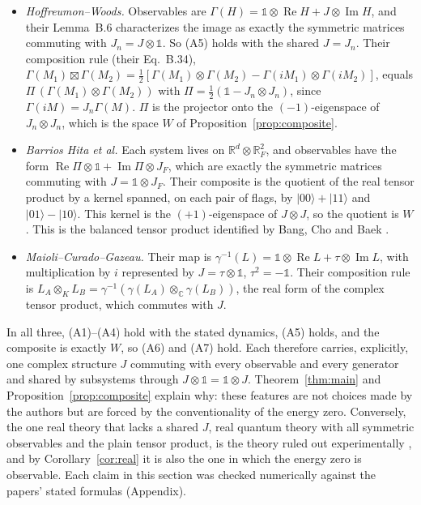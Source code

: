 \documentclass[11pt]{article}
\theoremstyle{remark}
\newcommand{\R}{\mathbb{R}}
\newcommand{\C}{\mathbb{C}}
\newcommand{\one}{\mathbb{1}}
\begin{document}
\begin{itemize}
\item \emph{Hoffreumon--Woods.} Observables are $\Gamma(H)=\one\otimes\operatorname{Re}H+J\otimes\operatorname{Im}H$, and their Lemma~B.6 characterizes the image as exactly the symmetric matrices commuting with $J_n=J\otimes\one$. So (A5) holds with the shared $J=J_n$. Their composition rule (their Eq.~B.34), $\Gamma(M_1)\boxtimes\Gamma(M_2)=\tfrac12[\Gamma(M_1)\otimes\Gamma(M_2)-\Gamma(iM_1)\otimes\Gamma(iM_2)]$, equals $\Pi\,(\Gamma(M_1)\otimes\Gamma(M_2))$ with $\Pi=\tfrac12(\one-J_n\otimes J_n)$, since $\Gamma(iM)=J_n\Gamma(M)$. $\Pi$ is the projector onto the $(-1)$-eigenspace of $J_n\otimes J_n$, which is the space $W$ of Proposition~\ref{prop:composite}.
\item \emph{Barrios Hita et al.} Each system lives on $\R^d\otimes\R^2_F$, and observables have the form $\operatorname{Re}\Pi\otimes\one+\operatorname{Im}\Pi\otimes J_F$, which are exactly the symmetric matrices commuting with $J=\one\otimes J_F$. Their composite is the quotient of the real tensor product by a kernel spanned, on each pair of flags, by $|00\rangle+|11\rangle$ and $|01\rangle-|10\rangle$. This kernel is the $(+1)$-eigenspace of $J\otimes J$, so the quotient is $W$. This is the balanced tensor product identified by Bang, Cho and Baek \cite{BangChoBaek}.
\item \emph{Maioli--Curado--Gazeau.} Their map is $\gamma^{-1}(L)=\one\otimes\operatorname{Re}L+\tau\otimes\operatorname{Im}L$, with multiplication by $i$ represented by $J=\tau\otimes\one$, $\tau^2=-\one$. Their composition rule is $L_A\otimes_K L_B=\gamma^{-1}(\gamma(L_A)\otimes_{\C}\gamma(L_B))$, the real form of the complex tensor product, which commutes with $J$.
\end{itemize}

In all three, (A1)--(A4) hold with the stated dynamics, (A5) holds, and the composite is exactly $W$, so (A6) and (A7) hold. Each therefore carries, explicitly, one complex structure $J$ commuting with every observable and every generator and shared by subsystems through $J\otimes\one=\one\otimes J$. Theorem~\ref{thm:main} and Proposition~\ref{prop:composite} explain why: these features are not choices made by the authors but are forced by the conventionality of the energy zero. Conversely, the one real theory that lacks a shared $J$, real quantum theory with all symmetric observables and the plain tensor product, is the theory ruled out experimentally \cite{Renou,Chen,Li}, and by Corollary~\ref{cor:real} it is also the one in which the energy zero is observable. Each claim in this section was checked numerically against the papers' stated formulas (Appendix).
\end{document}
